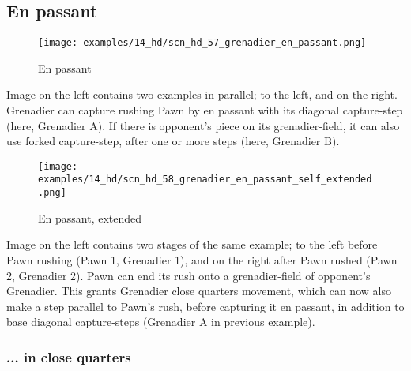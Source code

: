 \clearpage %

\subsection*{En passant}
\label{sec:Hemera's Dawn/Grenadier/En passant}

\vspace*{-1.1\baselineskip}
\noindent
\begin{wrapfigure}[10]{l}{0.4\textwidth}
\centering
\texttt{[image: examples/14\_hd/scn\_hd\_57\_grenadier\_en\_passant.png]}
\vspace*{-1.4\baselineskip}
\caption{En passant}
\label{fig:scn_hd_57_grenadier_en_passant}
\end{wrapfigure}
Image on the left contains two examples in parallel; to the left, and on the right.\newline
\indent
Grenadier can capture rushing Pawn by en passant with its diagonal capture-step (here,
Grenadier A). If there is opponent's piece on its grenadier-field, it can also use
forked capture-step, after one or more steps (here, Grenadier B).

\vspace*{3.1\baselineskip}
\noindent
\begin{wrapfigure}[15]{l}{0.4\textwidth}
\centering
\texttt{[image: examples/14\_hd/scn\_hd\_58\_grenadier\_en\_passant\_self\_extended.png]}
\vspace*{-1.4\baselineskip}
\caption{En passant, extended}
\label{fig:scn_hd_58_grenadier_en_passant_self_extended}
\end{wrapfigure}
Image on the left contains two stages of the same example; to the left before Pawn
rushing (Pawn 1, Grenadier 1), and on the right after Pawn rushed (Pawn 2, Grenadier
2).\newline
\indent
Pawn can end its rush onto a grenadier-field of opponent's Grenadier. This grants
Grenadier close quarters movement, which can now also make a step parallel to Pawn's
rush, before capturing it en passant, in addition to base diagonal capture-steps
(Grenadier A in previous example).

\clearpage %

\subsubsection*{... in close quarters}
\label{sec:Hemera's Dawn/Grenadier/En passant/... in close quarters}

